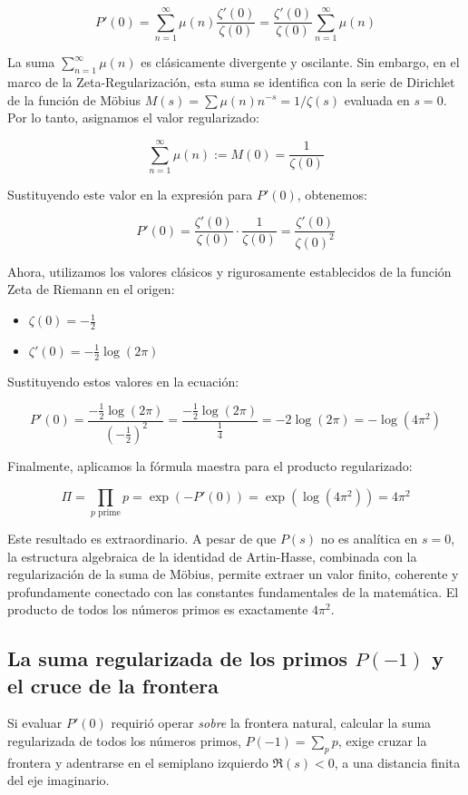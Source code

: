 $$ P'(0) = \sum_{n=1}^{\infty} \mu(n) \frac{\zeta'(0)}{\zeta(0)} = \frac{\zeta'(0)}{\zeta(0)} \sum_{n=1}^{\infty} \mu(n) $$

La suma $\sum_{n=1}^{\infty} \mu(n)$ es clásicamente divergente y oscilante. Sin embargo, en el marco de la Zeta-Regularización, esta suma se identifica con la serie de Dirichlet de la función de Möbius $M(s) = \sum \mu(n) n^{-s} = 1/\zeta(s)$ evaluada en $s=0$. Por lo tanto, asignamos el valor regularizado:

$$ \sum_{n=1}^{\infty} \mu(n) := M(0) = \frac{1}{\zeta(0)} $$

Sustituyendo este valor en la expresión para $P'(0)$, obtenemos:

$$ P'(0) = \frac{\zeta'(0)}{\zeta(0)} \cdot \frac{1}{\zeta(0)} = \frac{\zeta'(0)}{\zeta(0)^2} $$

Ahora, utilizamos los valores clásicos y rigurosamente establecidos de la función Zeta de Riemann en el origen:
\begin{itemize}
    \item $\zeta(0) = -\frac{1}{2}$
    \item $\zeta'(0) = -\frac{1}{2} \log(2\pi)$
\end{itemize}

Sustituyendo estos valores en la ecuación:

$$ P'(0) = \frac{-\frac{1}{2} \log(2\pi)}{\left(-\frac{1}{2}\right)^2} = \frac{-\frac{1}{2} \log(2\pi)}{\frac{1}{4}} = -2 \log(2\pi) = -\log(4\pi^2) $$

Finalmente, aplicamos la fórmula maestra para el producto regularizado:

$$ \Pi = \prod_{p \text{ prime}} p = \exp(-P'(0)) = \exp(\log(4\pi^2)) = 4\pi^2 $$

Este resultado es extraordinario. A pesar de que $P(s)$ no es analítica en $s=0$, la estructura algebraica de la identidad de Artin-Hasse, combinada con la regularización de la suma de Möbius, permite extraer un valor finito, coherente y profundamente conectado con las constantes fundamentales de la matemática. El producto de todos los números primos es exactamente $4\pi^2$.

\subsection{La suma regularizada de los primos $P(-1)$ y el cruce de la frontera}

Si evaluar $P'(0)$ requirió operar \textit{sobre} la frontera natural, calcular la suma regularizada de todos los números primos, $P(-1) = \sum_{p} p$, exige cruzar la frontera y adentrarse en el semiplano izquierdo $\Re(s) < 0$, a una distancia finita del eje imaginario. 

